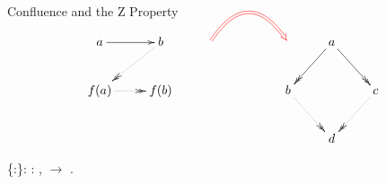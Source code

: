 \documentclass[10pt]{beamer}
\begin{document}
\begin{frame}[fragile]{Confluence and the Z Property}
  
  \[
    \xymatrix{
      a \ar[r] &  b \ar@{.>>}[dl] & \ar@/^2.0pc/@{=>}@[red][rr] & &    & a \ar@{->>}[dl] \ar@{->>}[dr] & \\ 
      f(a) \ar@{.>>}[r] & f(b) & & &   b \ar@{.>>}[dr] &  & c \ar@{.>>}[dl] \\
      & & & &       & d & 
            }
  \]
  
  \begin{coqdoccode}
      \{:\}: \coqdockw{\ensuremath{\forall}} :  ,   \ensuremath{\rightarrow}  .\coqdoceol
  \end{coqdoccode}
\end{frame}



\end{document}

